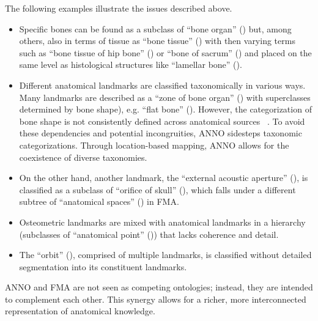 \documentclass[sw]{iosart2x}
\begin{document}
The following examples illustrate the issues described above.

\begin{itemize}
\item Specific bones can be found as a subclass of \enquote{bone organ} () but, among others, also in terms of tissue as \enquote{bone tissue} ()
with then varying terms such as \enquote{bone tissue of hip bone} () or \enquote{bone of sacrum} ()
and placed on the same level as histological structures like \enquote{lamellar bone} ().
\item Different anatomical landmarks are classified taxonomically in various ways.
Many landmarks are described as a \enquote{zone of bone organ} () with superclasses determined by bone shape), e.g. \enquote{flat bone} ().
However, the categorization of bone shape is not consistently defined across anatomical sources ~\citep{anatomiedesmenschen,forensicmanual}.
To avoid these dependencies and potential incongruities, ANNO sidesteps taxonomic categorizations.
Through location-based mapping, ANNO allows for the coexistence of diverse taxonomies.
\item On the other hand, another landmark, the \enquote{external acoustic aperture} (), is classified as a subclass of \enquote{orifice of skull} (),
which falls under a different subtree of \enquote{anatomical spaces} () in FMA.
\item Osteometric landmarks are mixed with anatomical landmarks in a hierarchy (subclasses of \enquote{anatomical point} ()) that lacks coherence and detail.
\item The \enquote{orbit} (), comprised of multiple landmarks, is classified without detailed segmentation into its constituent landmarks.
\end{itemize}

ANNO and FMA are not seen as competing ontologies; instead, they are intended to complement each other.
This synergy allows for a richer, more interconnected representation of anatomical knowledge.
\end{document}
